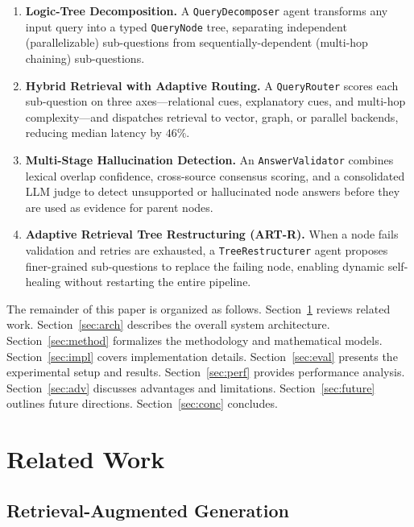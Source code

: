 \documentclass[conference]{IEEEtran}
\begin{document}
\begin{enumerate}
  \item \textbf{Logic-Tree Decomposition.} A \texttt{QueryDecomposer} agent
  transforms any input query into a typed \texttt{QueryNode} tree, separating
  independent (parallelizable) sub-questions from sequentially-dependent
  (multi-hop chaining) sub-questions.

  \item \textbf{Hybrid Retrieval with Adaptive Routing.} A \texttt{QueryRouter}
  scores each sub-question on three axes---relational cues, explanatory cues,
  and multi-hop complexity---and dispatches retrieval to vector, graph, or
  parallel backends, reducing median latency by $46\%$.

  \item \textbf{Multi-Stage Hallucination Detection.}  An \texttt{AnswerValidator}
  combines lexical overlap confidence, cross-source consensus scoring, and a
  consolidated LLM judge to detect unsupported or hallucinated node answers
  before they are used as evidence for parent nodes.

  \item \textbf{Adaptive Retrieval Tree Restructuring (ART-R).}  When a node
  fails validation and retries are exhausted, a \texttt{TreeRestructurer} agent
  proposes finer-grained sub-questions to replace the failing node, enabling
  dynamic self-healing without restarting the entire pipeline.
\end{enumerate}

The remainder of this paper is organized as follows.
Section~\ref{sec:related} reviews related work.
Section~\ref{sec:arch} describes the overall system architecture.
Section~\ref{sec:method} formalizes the methodology and mathematical models.
Section~\ref{sec:impl} covers implementation details.
Section~\ref{sec:eval} presents the experimental setup and results.
Section~\ref{sec:perf} provides performance analysis.
Section~\ref{sec:adv} discusses advantages and limitations.
Section~\ref{sec:future} outlines future directions.
Section~\ref{sec:conc} concludes.

\section{Related Work}
\label{sec:related}

\subsection{Retrieval-Augmented Generation}
\end{document}
